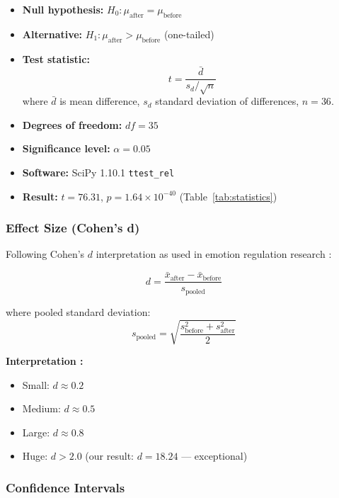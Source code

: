 \documentclass[11pt,letterpaper]{article}
\begin{document}
\begin{itemize}
\item \textbf{Null hypothesis:} $H_0: \mu_{\text{after}} = \mu_{\text{before}}$
\item \textbf{Alternative:} $H_1: \mu_{\text{after}} > \mu_{\text{before}}$ (one-tailed)
\item \textbf{Test statistic:}
\begin{equation}
t = \frac{\bar{d}}{s_d/\sqrt{n}}
\end{equation}
where $\bar{d}$ is mean difference, $s_d$ standard deviation of differences, $n=36$.
\item \textbf{Degrees of freedom:} $df = 35$
\item \textbf{Significance level:} $\alpha = 0.05$
\item \textbf{Software:} SciPy 1.10.1 \texttt{ttest\_rel}
\item \textbf{Result:} $t=76.31$, $p=1.64\times 10^{-40}$ (Table~\ref{tab:statistics})
\end{itemize}

\subsubsection{Effect Size (Cohen's d)}

Following Cohen's $d$ interpretation as used in emotion regulation research \cite{keng2011effect}:

\begin{equation}
d = \frac{\bar{x}_{\text{after}} - \bar{x}_{\text{before}}}{s_{\text{pooled}}}
\end{equation}

where pooled standard deviation:
\begin{equation}
s_{\text{pooled}} = \sqrt{\frac{s_{\text{before}}^2 + s_{\text{after}}^2}{2}}
\end{equation}

\textbf{Interpretation \cite{keng2011effect}:}
\begin{itemize}
\item Small: $d \approx 0.2$
\item Medium: $d \approx 0.5$
\item Large: $d \approx 0.8$
\item Huge: $d > 2.0$ (our result: $d=18.24$ --- exceptional)
\end{itemize}

\subsubsection{Confidence Intervals}
\end{document}
